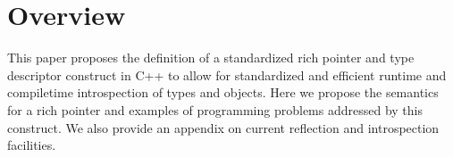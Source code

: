 \section{Overview}

This paper proposes the definition of a standardized rich pointer and type
descriptor construct in C++ to allow for standardized and efficient runtime
and compiletime introspection of types and objects. Here we propose the
semantics for a rich pointer and examples of programming problems addressed by
this construct. We also provide an appendix on current reflection and
introspection facilities.
